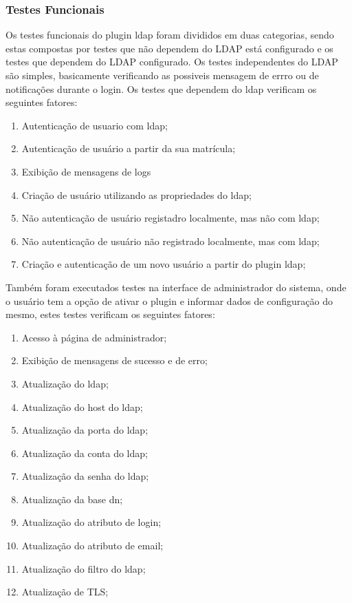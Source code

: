\subsubsection{Testes Funcionais}
%
Os testes funcionais do plugin ldap foram divididos em duas categorias, sendo estas compostas por testes que não dependem do LDAP está configurado e os testes que dependem do LDAP configurado. Os testes independentes do LDAP são simples, basicamente verificando as possiveis mensagem de errro ou de notificações durante o login. Os testes  que dependem do ldap verificam os seguintes fatores:
%
\begin{enumerate}
\item Autenticação de usuario com ldap;
\item Autenticação de usuário a partir da sua matrícula;
\item Exibição de mensagens de logs
\item Criação de usuário utilizando as propriedades do ldap;
\item Não autenticação de usuário registadro localmente, mas não com ldap;
\item Não autenticação de usuário não registrado localmente, mas com ldap;
\item Criação e autenticação de um novo usuário a partir do plugin ldap;
\end{enumerate}
%
Também foram executados testes na interface de administrador do sistema, onde o usuário tem a opção de ativar o plugin e informar dados de configuração do mesmo, estes testes verificam os seguintes fatores:
%
\begin{enumerate}
\item Acesso à página de administrador;
\item Exibição de mensagens de sucesso e de erro;
\item Atualização do ldap;
\item Atualização do host do ldap;
\item Atualização da porta do ldap;
\item Atualização da conta do ldap;
\item Atualização da senha do ldap;
\item Atualização da base dn;
\item Atualização do atributo de login;
\item Atualização do atributo de email;
\item Atualização do filtro do ldap;
\item Atualização de TLS;
\end{enumerate}

